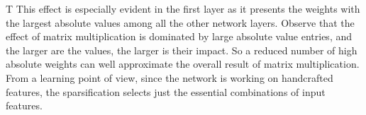 T%
This effect is especially evident in the first layer as it presents the weights with the largest absolute values among all the other network layers. Observe that the effect of matrix multiplication is dominated by large absolute value entries, and the larger are the values, the larger is their impact. So a reduced number of high absolute weights can well approximate the overall result of matrix multiplication. From a learning point of view, since the network is working on handcrafted features, the sparsification selects just the essential combinations of input features.

